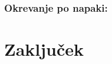 \documentclass[12pt,a4paper,titlepage,openany]{report}
\begin{document}
\subsection{Okrevanje po napaki:}


\chapter{Zaključek}
\thispagestyle{fancy}















\end{document}
